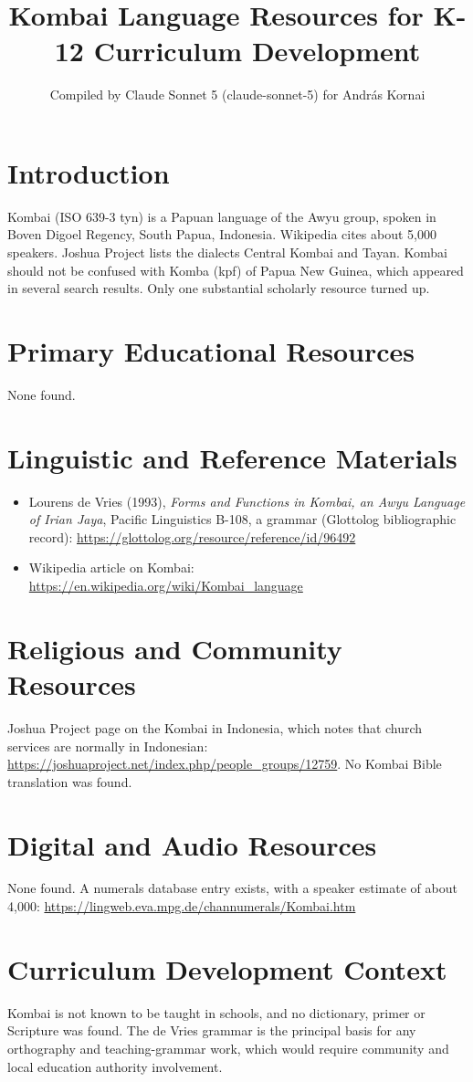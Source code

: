 \documentclass[12pt]{article}
\title{Kombai Language Resources for K-12 Curriculum Development}
\author{Compiled by Claude Sonnet 5 (claude-sonnet-5) for Andr\'as Kornai}
\date{}
\begin{document}
\maketitle

\section{Introduction}
Kombai (ISO 639-3 tyn) is a Papuan language of the Awyu group, spoken in Boven Digoel Regency, South Papua, Indonesia. Wikipedia cites about 5,000 speakers. Joshua Project lists the dialects Central Kombai and Tayan. Kombai should not be confused with Komba (kpf) of Papua New Guinea, which appeared in several search results. Only one substantial scholarly resource turned up.

\section{Primary Educational Resources}
None found.

\section{Linguistic and Reference Materials}
\begin{itemize}
\item Lourens de Vries (1993), \emph{Forms and Functions in Kombai, an Awyu Language of Irian Jaya}, Pacific Linguistics B-108, a grammar (Glottolog bibliographic record): \url{https://glottolog.org/resource/reference/id/96492}
\item Wikipedia article on Kombai: \url{https://en.wikipedia.org/wiki/Kombai_language}
\end{itemize}

\section{Religious and Community Resources}
Joshua Project page on the Kombai in Indonesia, which notes that church services are normally in Indonesian: \url{https://joshuaproject.net/index.php/people_groups/12759}. No Kombai Bible translation was found.

\section{Digital and Audio Resources}
None found. A numerals database entry exists, with a speaker estimate of about 4,000: \url{https://lingweb.eva.mpg.de/channumerals/Kombai.htm}

\section{Curriculum Development Context}
Kombai is not known to be taught in schools, and no dictionary, primer or Scripture was found. The de Vries grammar is the principal basis for any orthography and teaching-grammar work, which would require community and local education authority involvement.
\end{document}
